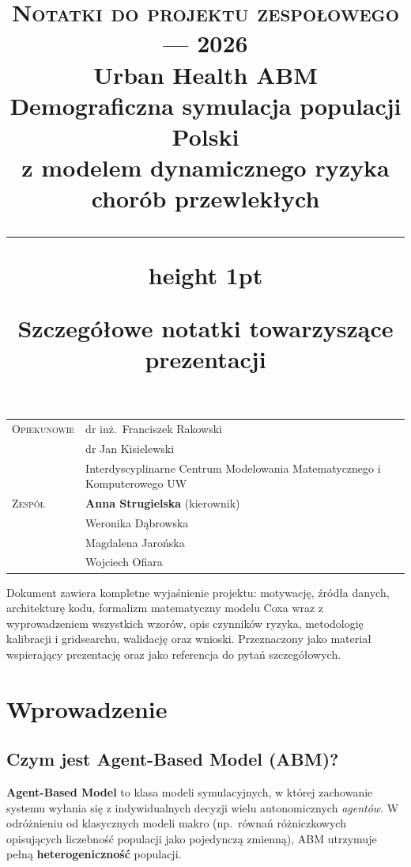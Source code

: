 \documentclass[11pt,a4paper]{article}
\title{
  \vspace{-1.5cm}
  {\small\color{gold}\textsc{Notatki do projektu zespołowego --- 2026}}\\[10pt]
  {\Huge\bfseries\color{ink} Urban Health ABM}\\[6pt]
  {\large\color{ink!70} Demograficzna symulacja populacji Polski}\\[3pt]
  {\large\color{ink!70} z modelem dynamicznego ryzyka chorób przewlekłych}\\[20pt]
  {\color{rule}\hrule height 1pt}
  \vspace{6pt}
  {\small\color{muted}Szczegółowe notatki towarzyszące prezentacji}
}
\author{}
\date{}
\begin{document}
\maketitle
\thispagestyle{empty}

\vspace{-1cm}
\begin{center}
\begin{tabular}{ll}
\textsc{Opiekunowie} & dr inż.\ Franciszek Rakowski \\
                     & dr Jan Kisielewski \\[2pt]
                     & {\small\color{muted} Interdyscyplinarne Centrum Modelowania Matematycznego i Komputerowego UW} \\[14pt]
\textsc{Zespół}      & \textbf{Anna Strugielska} (kierownik) \\
                     & Weronika Dąbrowska \\
                     & Magdalena Jarońska \\
                     & Wojciech Ofiara \\
\end{tabular}
\end{center}

\vspace{2cm}
\noindent\textcolor{muted}{\small Dokument zawiera kompletne wyjaśnienie projektu: motywację, źródła danych, architekturę kodu, formalizm matematyczny modelu Coxa wraz z wyprowadzeniem wszystkich wzorów, opis czynników ryzyka, metodologię kalibracji i gridsearchu, walidację oraz wnioski. Przeznaczony jako materiał wspierający prezentację oraz jako referencja do pytań szczegółowych.}

\newpage
\tableofcontents
\newpage

\section{Wprowadzenie}

\subsection{Czym jest Agent-Based Model (ABM)?}

\textbf{Agent-Based Model} to klasa modeli symulacyjnych, w której zachowanie systemu wyłania się z indywidualnych decyzji wielu autonomicznych \emph{agentów}. W odróżnieniu od klasycznych modeli makro (np.\ równań różniczkowych opisujących liczebność populacji jako pojedynczą zmienną), ABM utrzymuje pełną \textbf{heterogeniczność} populacji.
\end{document}

